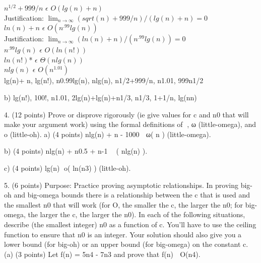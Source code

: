 \documentclass[12pt]{article}
\newenvironment{question}[2][Question]{\begin{trivlist}
		\item[\hskip \labelsep {\bfseries #1}\hskip \labelsep {\bfseries #2.}]}{\end{trivlist}}
\begin{document}
\begin{question}{3a}


$n^{1/2}+999/n$ $\epsilon$ $O(lg(n)+n)$\\
Justification: $\lim_{n\to\infty} (sqrt(n) + 999/n)/(lg(n)+n) = 0$\\

$ln(n)+n$ $\epsilon$ $O(n^{.99}lg(n))$ \\
Justification: $\lim_{n\to\infty} (ln(n)+n)/(n^{.99}lg(n)) = 0$\\

$n^{.99}lg(n)$ $\epsilon$ $O(ln(n!))$ \\
$ln(n!)$* $\epsilon$ $\Theta(nlg(n))$\\
$nlg(n)$ $\epsilon$ $O(n^{1.01})$\\




lg(n)+ n,	lg(n!),	n0.99lg(n),	nlg(n),	n1/2+999/n,	n1.01,		999n1/2


			\end{question}
	
\begin{question}{3b}	
		b) lg(n!),	100!,	n1.01,	2lg(n)+lg(n)+n1/3,		n1/3,	1+1/n,	 	lg(nn)
			\end{question}
	
\begin{question}{4a}	
		4. (12 points) Prove or disprove rigorously (ie give values for c and n0 that will make your argument work) using the formal definitions of , ω (little-omega), and o (little-oh).
		a) (4 points) nlg(n) + n - 1000  ω( n )  (little-omega).
			\end{question}
	
\begin{question}{4b}	
		b) (4 points) nlg(n) + n0.5 + n-1  ( nlg(n) ).
			\end{question}
	
\begin{question}{4c}	
		c) (4 points) lg(n) o( ln(n3) ) (little-oh).
		
			\end{question}
	
\begin{question}{5a}	
		5. (6 points) Purpose: Practice proving asymptotic relationships. In proving big-oh and big-omega bounds there is a relationship between the c that is used and the smallest n0 that will work (for O, the smaller the c, the larger the n0; for big-omega, the larger the c, the larger the n0). In each of the following situations, describe (the smallest integer) n0 as a function of c. You'll have to use the ceiling function to ensure that n0 is an integer. Your solution should also give you a lower bound (for big-oh) or an upper bound (for big-omega) on the constant c.
		(a) (3 points) Let f(n) = 5n4 - 7n3 and prove that f(n)  O(n4).
			\end{question}
	
\end{document}
